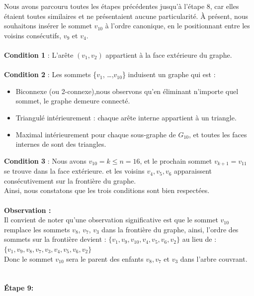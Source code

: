 \documentclass[hidelinks,letterpaper,12pt]{article}
\begin{document}
Nous avons parcouru toutes les étapes précédentes jusqu'à l'étape 8, car elles étaient toutes similaires et ne présentaient aucune particularité. À présent, nous souhaitons insérer le sommet $v_{10}$ à l'ordre canonique, en le positionnant entre les voisins consécutifs, $v_9$ et $v_4$.
\\ \\
\textbf{Condition 1} : L'arête \( (v_1,v_2) \) appartient à la face extérieure du graphe.
\\ \\
\textbf{Condition 2} : Les sommets \{$v_1$, \ldots ,$v_{10}$\} induisent un graphe qui est :
\begin{itemize}
\item Biconnexe (ou 2-connexe),nous observons qu'en éliminant n'importe quel sommet, le graphe demeure connecté.
\item Triangulé intérieurement : chaque arête interne appartient à un triangle.
\item Maximal intérieurement pour chaque sous-graphe de $G_{10}$, et toutes les faces internes de sont des triangles.
\\
\end{itemize}
\textbf{Condition 3} : Nous avons $v_{10}=k \leq n=16$, et le prochain sommet $v_{k+1}=v_{11}$ se trouve dans la face extérieure. et les voisins \(v_4, v_5, v_6\) apparaissent consécutivement sur la frontière du graphe.
\\
Ainsi, nous constatons que les trois conditions sont bien respectées.
\\ \\
\textbf{Observation :}
\\
Il convient de noter qu'une observation significative est que le sommet $v_{10}$ remplace les sommets $v_8$, $v_7$, $v_3$ dans la frontière du graphe, ainsi, l'ordre des sommets sur la frontière devient : \( \{v_1, v_9, v_{10}, v_4, v_5, v_6, v_2 \} \)
au lieu de : \( \{v_1, v_9, v_8, v_7, v_3, v_4, v_5, v_6, v_2\} \) 
\\
Donc le sommet \(v_{10}\) sera le parent des enfants \(v_8, v_7\) et \(v_3\) dans l'arbre couvrant.
\\ \\ \\ 
\textbf{Étape 9:}
\end{document}
